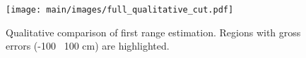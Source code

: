 \begin{figure}[t]
\centering
\texttt{[image: main/images/full\_qualitative\_cut.pdf]}
\caption{Qualitative comparison of first range estimation. Regions with gross errors (-100 \bwr~100 cm) are highlighted.}
\label{fig:iccv_full_qualitative}
\end{figure}